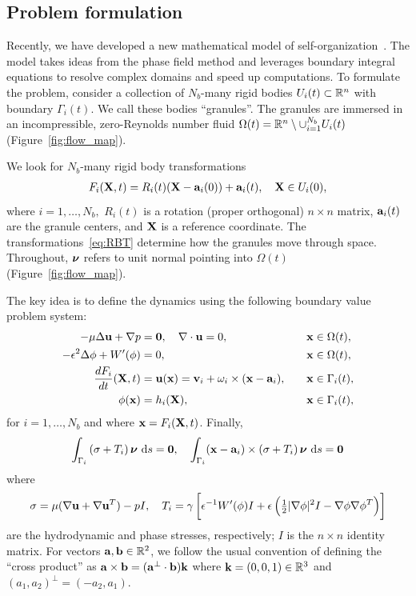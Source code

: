 \subsection{Problem formulation}
Recently, we have developed a new mathematical model of
self-organization~\cite{FuQuRyYo22,fu-ryh-qua-you2022,Fu2018_SIAM}. The
model takes ideas from the phase field method and leverages boundary
integral equations to resolve complex domains and speed up computations.
To formulate the problem, consider a collection of $N_b$-many rigid
bodies $U_i(t) \subset \RR^n$ with boundary $\Gamma_i(t)$. We call these
bodies ``granules''. The granules are immersed in an incompressible,
zero-Reynolds number fluid $\Omega(t) = \RR^n \setminus \cup_{i=1}^{N_b}
U_i(t)$ (Figure~\ref{fig:flow_map}).

We look for $N_b$-many rigid body transformations
\begin{align}
\label{eq:RBT}
  F_i(\XX,t) = R_i(t)(\XX - \aa_i(0)) + \aa_i(t),\quad \XX \in U_i(0),
\end{align}
where $i = 1,\ldots,N_b,$ $R_i(t)$ is a rotation (proper orthogonal) $n
\times n$ matrix, $\aa_i(t)$ are the granule centers, and $\XX$ is a
reference coordinate. The transformations~\eqref{eq:RBT} determine how
the granules move through space. Throughout, $\nnu$ refers to unit
normal pointing into $\Omega(t)$ (Figure~\ref{fig:flow_map}).

The key idea is to define the dynamics using the following boundary
value problem system:
\begin{alignat}{4}
  \label{eqn:stokes} 
  -\mu\Delta \uu + \nabla p &= \mathbf{0}, 
  \quad \nabla \cdot \uu = 0, &&\xx \in \Omega(t), \\
  \label{eqn:phase}
  -\epsilon^2 \Delta \phi + W'(\phi) &= 0, &&\xx \in \Omega(t),\\
  \label{eqn:noslip}        
  \frac{dF_i}{dt}(\XX,t) & = \uu(\xx) = 
    \vv_i + \omega_i \times (\xx - \aa_i), 
  \quad &&\xx \in \Gamma_i(t),\\
  \label{eqn:material}
  \phi(\xx) &= h_i(\XX),  &&\xx \in \Gamma_i(t),
\end{alignat}
for $i=1,\ldots,N_b$ and where $\xx = F_i(\XX,t)$.  Finally,
\begin{align}
\label{eqn:stressbalance}
\int_{\Gamma_i} \left(\sigma  + T_i\right)\nnu \,\dif s = \mathbf{0},\quad
\int_{\Gamma_i} (\xx - \aa_i)\times \left(\sigma + T_i\right) \nnu \,\dif s = \mathbf{0}
\end{align}
where
\begin{align}
\label{eqn:hydro_stress}
\sigma = \mu(\nabla \uu + \nabla \uu^T) - pI,\quad 
T_i = \gamma\left[\epsilon^{-1} W'(\phi)I
  + \epsilon\left(\tfrac{1}{2}|\nabla \phi|^2I - \nabla \phi \nabla
  \phi^T\right)\right]
\end{align}
are the hydrodynamic and phase stresses, respectively; $I$ is the
$n\times n$ identity matrix. For vectors $\aa, \bb \in \mathbb{R}^2$,
we follow the usual convention of defining the ``cross product'' as $\aa
\times \bb = (\aa^{\perp} \cdot \bb) \kk$ where $\kk = (0,0,1) \in
\RR^3$ and $(a_1,a_2)^{\perp} = (-a_2,a_1)$.

